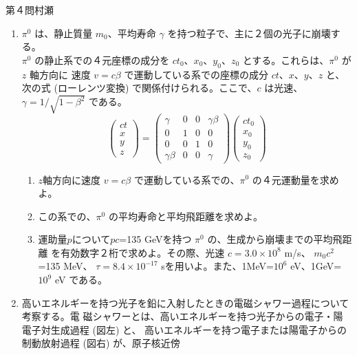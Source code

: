 \begin{question}{第４問}{村瀬}
\begin{enumerate}
\item
  $\pi^0$ は、静止質量 $m_0$、平均寿命 $\gamma$ を持つ粒子で、主に２個の光子に崩壊する。\\
  $\pi^0$ の静止系での４元座標の成分を $ct_0$、$x_0$、$y_0$、$z_0$ とする。これらは、$\pi^0$ が $z$ 軸方向に
  速度 $v=c\beta$ で運動している系での座標の成分 $ct$、$x$、$y$、$z$ と、次の式 (ローレンツ変換)
  で関係付けられる。ここで、$c$ は光速、$\gamma=1/\sqrt{1-\beta^2}$ である。
  \[
    \left(\begin{array}{c}ct\\x\\y\\z\end{array}\right)
    =\left(\begin{array}{cccc}
      \gamma&0&0&\gamma\beta\\
      0&1&0&0\\
      0&0&1&0\\
      \gamma\beta&0&0&\gamma
    \end{array}\right)
    \left(\begin{array}{c}ct_0\\x_0\\y_0\\z_0\end{array}\right)
  \]
  \begin{enumerate}
  \item $z$軸方向に速度 $v=c\beta$ で運動している系での、$\pi^0$ の４元運動量を求めよ。
  \item この系での、$\pi^0$ の平均寿命と平均飛距離を求めよ。
  \item 
    運助量$p$について$pc$=135 GeVを持つ $\pi^0$ の、生成から崩壊までの平均飛距離
    を有効数字２桁で求めよ。その際、光速 $c=3.0\times10^8$ m/s、 $m_0c^2$=135 MeV、
    $\tau=8.4\times10^{-17}$ sを用いよ。また、1MeV=$10^6$ eV、1GeV=$10^9$ eV である。
  \end{enumerate}
\item
  高いエネルギーを持つ光子を鉛に入射したときの電磁シャワー過程について考察する。電
  磁シャワーとは、高いエネルギーを持つ光子からの電子・陽電子対生成過程 (図左) と、
  高いエネルギーを持つ電子または陽電子からの制動放射過程 (図右) が、原子核近傍

\end{enumerate}
\end{question}
